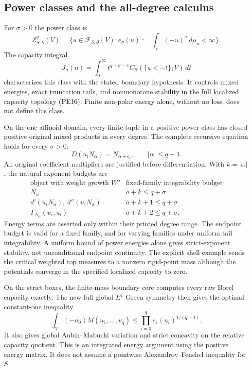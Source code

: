 \documentclass[11pt,a4paper]{article}
\numberwithin{equation}{section}
\theoremstyle{definition}
\theoremstyle{remark}
\begin{document}
\subsection{Power classes and the all-degree calculus}

For $\sigma>0$ the power class is
\[
 \mathcal E^\sigma_{S,\partial}(V)
     =\{u\in\mathcal F_{S,\partial}(V):
                  e_\sigma(u):=\int_V(-u)^\sigma\,d\mu_u<\infty\}.
 \tag{M6}
\]
The capacity integral
\[
 J_\sigma(u)=
       \int_0^\infty t^{q+\sigma-1}
                        C_S(\{u<-t\};V)\,dt
 \tag{M7}
\]
characterizes this class with the stated boundary
hypothesis.  It controls mixed energies, exact
truncation tails, and nonmonotone stability in the
full localized capacity topology (PE16).
Finite non-polar energy alone, without no loss,
does not define this class.

On the one-affinoid domain, every finite tuple in a
positive power class has closed positive original
mixed products in every degree.  The complete
recursive equation holds for every $\sigma>0$:
\[
                D(u_iN_\alpha)=N_{\alpha+e_i},
                   \qquad |\alpha|\leq q-1.
 \tag{M8}
\]
All original coefficient multipliers are justified
before differentiation.  With $k=|\alpha|$, the
natural exponent budgets are
\[
\begin{array}{c|c}
\text{object with weight growth }W^a&
                    \text{fixed-family integrability budget}\\ \hline
 N_\alpha&a+k\leq q+\sigma\\
 d'(u_iN_\alpha),\ d''(u_iN_\alpha)&a+k+1\leq q+\sigma\\
 \Gamma_{N_\alpha}(u_i,u_l)&a+k+2\leq q+\sigma .
\end{array}
 \tag{M9}
\]
Energy terms are asserted only within their printed
degree range.  The endpoint budget is valid for a
fixed family, and for varying families under
uniform tail integrability.
A uniform bound of power energies alone gives
strict-exponent stability, not unconditional
endpoint continuity.
The explicit shell example sends the critical
weighted top measures to a nonzero rigid-point
mass although the potentials converge in the
specified localized capacity to zero.

On the strict boxes, the finite-mass boundary core
computes every raw Borel capacity exactly.
The new full global $E^1$ Green symmetry then gives
the optimal constant-one inequality
\[
 \int_V(-u_0)M(u_1,\ldots,u_q)
              \leq\prod_{i=0}^{q}e_1(u_i)^{1/(q+1)} .
 \tag{M10}
\]
It also gives global Aubin--Mabuchi variation and
strict concavity on the relative capacity quotient.
This is an integrated energy argument using the
positive energy matrix.  It does not assume a
pointwise Alexandrov--Fenchel inequality for $S$.
\end{document}
